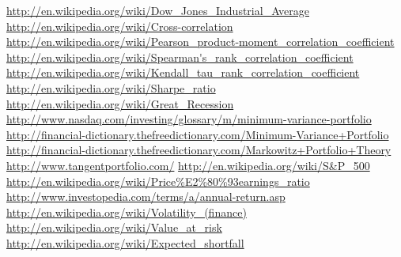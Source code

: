 \newpage \clearpage
\label{sec:references}

\begin{thebibliography}{100}
	 \url{http://en.wikipedia.org/wiki/Dow_Jones_Industrial_Average}
	 \url{http://en.wikipedia.org/wiki/Cross-correlation}
	 \url{http://en.wikipedia.org/wiki/Pearson_product-moment_correlation_coefficient}
	 \url{http://en.wikipedia.org/wiki/Spearman's_rank_correlation_coefficient}
	 \url{http://en.wikipedia.org/wiki/Kendall_tau_rank_correlation_coefficient}
	 \url{http://en.wikipedia.org/wiki/Sharpe_ratio}
	 \url{http://en.wikipedia.org/wiki/Great_Recession}
	 \url{http://www.nasdaq.com/investing/glossary/m/minimum-variance-portfolio}
	 \url{http://financial-dictionary.thefreedictionary.com/Minimum-Variance+Portfolio}
	 \url{http://financial-dictionary.thefreedictionary.com/Markowitz+Portfolio+Theory}
	 \url{http://www.tangentportfolio.com/}
	 \url{http://en.wikipedia.org/wiki/S\&P_500}
	 \url{http://en.wikipedia.org/wiki/Price\%E2\%80\%93earnings_ratio}
	 \url{http://www.investopedia.com/terms/a/annual-return.asp}
	 \url{http://en.wikipedia.org/wiki/Volatility_(finance)}
	 \url{http://en.wikipedia.org/wiki/Value_at_risk}
	 \url{http://en.wikipedia.org/wiki/Expected_shortfall}
 \end{thebibliography}
